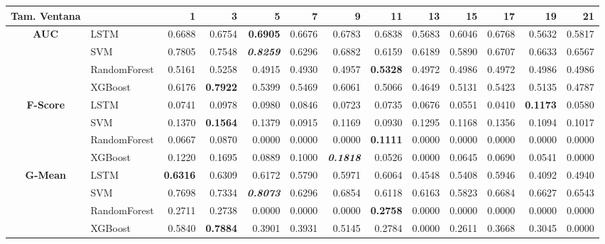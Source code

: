 \begin{table}[H]
	\centering
	\begin{adjustbox}{max width=12cm}
		\begin{tabular}{|c|l|r|r|r|r|r|r|r|r|r|r|r|}
			\hline
			\textbf{Tam. Ventana} &         &      1  &      3  &      5  &      7  &      9  &      11 &      13 &      15 &      17 &      19 &      21 \\
			\hline
			\textbf{AUC} &  LSTM &  0.6688 &  0.6754 & \textbf{  0.6905 } &  0.6676 &  0.6783 &  0.6838 &  0.5683 &  0.6046 &  0.6768 &  0.5632 &  0.5817 \\
			&  SVM &  0.7805 &  0.7548 & \textit{ \textbf{  0.8259 } } &  0.6296 &  0.6882 &  0.6159 &  0.6189 &  0.5890 &  0.6707 &  0.6633 &  0.6567 \\
			&  RandomForest &  0.5161 &  0.5258 &  0.4915 &  0.4930 &  0.4957 & \textbf{  0.5328 } &  0.4972 &  0.4986 &  0.4972 &  0.4986 &  0.4986 \\
			&  XGBoost &  0.6176 & \textbf{  0.7922 } &  0.5399 &  0.5469 &  0.6061 &  0.5066 &  0.4649 &  0.5131 &  0.5423 &  0.5135 &  0.4787 \\
			\hline
			\textbf{F-Score} &  LSTM &  0.0741 &  0.0978 &  0.0980 &  0.0846 &  0.0723 &  0.0735 &  0.0676 &  0.0551 &  0.0410 & \textbf{  0.1173 } &  0.0580 \\
			&  SVM &  0.1370 & \textbf{  0.1564 } &  0.1379 &  0.0915 &  0.1169 &  0.0930 &  0.1295 &  0.1168 &  0.1356 &  0.1094 &  0.1017 \\
			&  RandomForest &  0.0667 &  0.0870 &  0.0000 &  0.0000 &  0.0000 & \textbf{  0.1111 } &  0.0000 &  0.0000 &  0.0000 &  0.0000 &  0.0000 \\
			&  XGBoost &  0.1220 &  0.1695 &  0.0889 &  0.1000 & \textit{ \textbf{  0.1818 } } &  0.0526 &  0.0000 &  0.0645 &  0.0690 &  0.0541 &  0.0000 \\
			\hline
			\textbf{G-Mean} &  LSTM & \textbf{  0.6316 } &  0.6309 &  0.6172 &  0.5790 &  0.5971 &  0.6064 &  0.4548 &  0.5408 &  0.5946 &  0.4092 &  0.4940 \\
			&  SVM &  0.7698 &  0.7334 & \textit{ \textbf{  0.8073 } } &  0.6296 &  0.6854 &  0.6118 &  0.6163 &  0.5823 &  0.6684 &  0.6627 &  0.6543 \\
			&  RandomForest &  0.2711 &  0.2738 &  0.0000 &  0.0000 &  0.0000 & \textbf{  0.2758 } &  0.0000 &  0.0000 &  0.0000 &  0.0000 &  0.0000 \\
			&  XGBoost &  0.5840 & \textbf{  0.7884 } &  0.3901 &  0.3931 &  0.5145 &  0.2784 &  0.0000 &  0.2611 &  0.3668 &  0.3045 &  0.0000 \\

\end{tabular}
\end{adjustbox}
\end{table}
